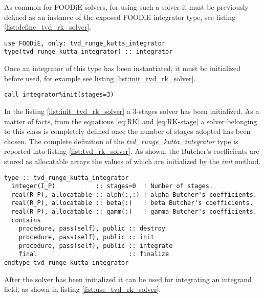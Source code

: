 \documentclass[pdftex,preprint,3p,times,numbers]{elsarticle}
\begin{document}
As common for FOODiE solvers, for using such a solver it must be previously defined as an instance of the exposed FOODiE integrator type, see listing \ref{list:define_tvd_rk_solver}.

\begin{lstlisting}[firstnumber=1,style=code,caption={definition of an explicit TVD/SSP Runge-Kutta integrator},label={list:define_tvd_rk_solver}]
use FOODiE, only: tvd_runge_kutta_integrator
type(tvd_runge_kutta_integrator) :: integrator
\end{lstlisting}

Once an integrator of this type has been instantiated, it must be initialized before used, for example see listing \ref{list:init_tvd_rk_solver}.

\begin{lstlisting}[firstnumber=1,style=code,caption={example of initialization of an explicit TVD/SSP Runge-Kutta integrator},label={list:init_tvd_rk_solver}]
call integrator%init(stages=3)
\end{lstlisting}

In the listing \ref{list:init_tvd_rk_solver} a 3-stages solver has been initialized. As a matter of facts, from the equations \ref{eq:RK} and \ref{eq:RK-stage} a solver belonging to this class is completely defined once the number of stages adopted has been chosen. The complete definition of the \emph{tvd\_runge\_kutta\_integrator} type is reported into listing \ref{list:tvd_rk_solver}. As shown, the Butcher's coefficients are stored as allocatable arrays the values of which are initialized by the \emph{init} method.

\begin{lstlisting}[firstnumber=1,style=code,caption={definition of \emph{tvd\_runge\_kutta\_integrator} type},label={list:tvd_rk_solver}]
type :: tvd_runge_kutta_integrator
  integer(I_P)           :: stages=0  ! Number of stages.
  real(R_P), allocatable :: alph(:,:) ! alpha Butcher's coefficients.
  real(R_P), allocatable :: beta(:)   ! beta Butcher's coefficients.
  real(R_P), allocatable :: gamm(:)   ! gamma Butcher's coefficients.
  contains
    procedure, pass(self), public :: destroy
    procedure, pass(self), public :: init
    procedure, pass(self), public :: integrate
    final                         :: finalize
endtype tvd_runge_kutta_integrator
\end{lstlisting}

After the solver has been initialized it can be used for integrating an integrand field, as shown in listing \ref{list:use_tvd_rk_solver}.
\end{document}
